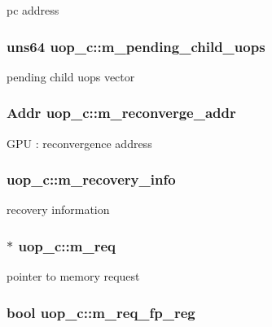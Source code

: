 \label{classuop__c_ae6f4147d85b5772d8fe5e0ad900aa9a2}
pc address \hypertarget{classuop__c_a27555c938d5442471b84010767769e42}{
\subsubsection[{m\_\-pending\_\-child\_\-uops}]{\setlength{\rightskip}{0pt plus 5cm}uns64 {\bf uop\_\-c::m\_\-pending\_\-child\_\-uops}}}
\label{classuop__c_a27555c938d5442471b84010767769e42}
pending child uops vector \hypertarget{classuop__c_a1b4ca5b212004b9b759366edf1f5230d}{
\subsubsection[{m\_\-reconverge\_\-addr}]{\setlength{\rightskip}{0pt plus 5cm}Addr {\bf uop\_\-c::m\_\-reconverge\_\-addr}}}
\label{classuop__c_a1b4ca5b212004b9b759366edf1f5230d}
GPU : reconvergence address \hypertarget{classuop__c_a5e089783cc7382e60170bb49e412f6c8}{
\subsubsection[{m\_\-recovery\_\-info}]{ {\bf uop\_\-c::m\_\-recovery\_\-info}}}
\label{classuop__c_a5e089783cc7382e60170bb49e412f6c8}
recovery information \hypertarget{classuop__c_a793e716bd61ad15970b3ffe2063b3e8b}{
\subsubsection[{m\_\-req}]{$\ast$ {\bf uop\_\-c::m\_\-req}}}
\label{classuop__c_a793e716bd61ad15970b3ffe2063b3e8b}
pointer to memory request \hypertarget{classuop__c_ac9a30f13d75fc5b053cba1eee35b5c04}{
\subsubsection[{m\_\-req\_\-fp\_\-reg}]{\setlength{\rightskip}{0pt plus 5cm}bool {\bf uop\_\-c::m\_\-req\_\-fp\_\-reg}}}
